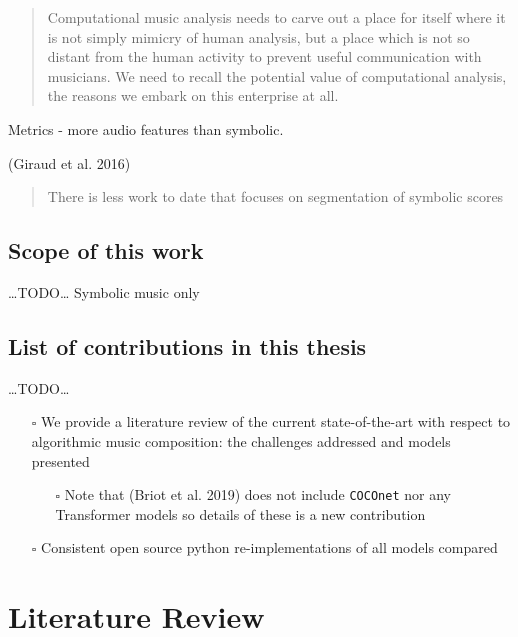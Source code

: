 \documentclass[12pt,a4paper,]{report}
\providecommand{\tightlist}{%
  \setlength{\itemsep}{0pt}\setlength{\parskip}{0pt}}
\begin{document}
\begin{quote}
Computational music analysis needs to carve out a place for itself where
it is not simply mimicry of human analysis, but a place which is not so
distant from the human activity to prevent useful communication with
musicians. We need to recall the potential value of computational
analysis, the reasons we embark on this enterprise at all.
\end{quote}

Metrics - more audio features than symbolic.

(Giraud et al. 2016)

\begin{quote}
There is less work to date that focuses on segmentation of symbolic
scores
\end{quote}

\hypertarget{scope-of-this-work}{%
\section{Scope of this work}\label{scope-of-this-work}}

\ldots TODO\ldots{} Symbolic music only

\hypertarget{list-of-contributions-in-this-thesis}{%
\section{List of contributions in this
thesis}\label{list-of-contributions-in-this-thesis}}

\ldots TODO\ldots{}

\begin{itemize}
\tightlist
\item[$\square$]
  We provide a literature review of the current state-of-the-art with
  respect to algorithmic music composition: the challenges addressed and
  models presented

  \begin{itemize}
  \tightlist
  \item[$\square$]
    Note that (Briot et al. 2019) does not include \texttt{COCOnet} nor
    any Transformer models so details of these is a new contribution
  \end{itemize}
\item[$\square$]
  Consistent open source python re-implementations of all models
  compared
\end{itemize}

\hypertarget{literature-review}{%
\chapter{Literature Review}\label{literature-review}}
\end{document}
